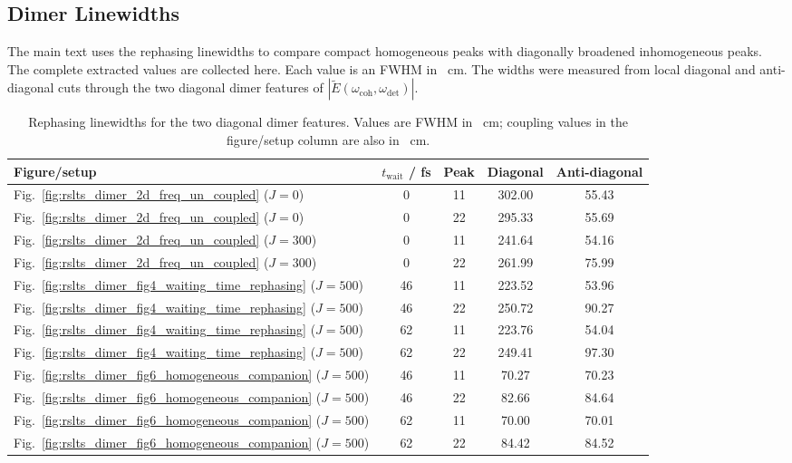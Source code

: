 \subsection{Dimer Linewidths}

The main text uses the rephasing linewidths to compare compact homogeneous
peaks with diagonally broadened inhomogeneous peaks. The complete extracted
values are collected here. Each value is an FWHM in \si{\per\centi\metre}. The
widths were measured from local diagonal and anti-diagonal cuts through the two
diagonal dimer features of
\(|\tilde{E}(\omega_{\mathrm{coh}},\omega_{\mathrm{det}})|\).

\begin{table}[htbp]
    \centering
    \scriptsize
    \caption{Rephasing linewidths for the two diagonal dimer features. Values
    are FWHM in \si{\per\centi\metre}; coupling values in the figure/setup
    column are also in \si{\per\centi\metre}.}
    \label{tab:app_dimer_2d_rephasing_linewidths}
    \begin{tabular}{@{}lcccc@{}}
        \toprule
        Figure/setup & $t_{\mathrm{wait}}$ / fs & Peak & Diagonal & Anti-diagonal \\
        \midrule
        Fig.~\ref{fig:rslts_dimer_2d_freq_un_coupled} ($J=0$)   & 0  & 11 & 302.00 & 55.43 \\
        Fig.~\ref{fig:rslts_dimer_2d_freq_un_coupled} ($J=0$)   & 0  & 22 & 295.33 & 55.69 \\
        Fig.~\ref{fig:rslts_dimer_2d_freq_un_coupled} ($J=300$) & 0  & 11 & 241.64 & 54.16 \\
        Fig.~\ref{fig:rslts_dimer_2d_freq_un_coupled} ($J=300$) & 0  & 22 & 261.99 & 75.99 \\
        Fig.~\ref{fig:rslts_dimer_fig4_waiting_time_rephasing} ($J=500$) & 46 & 11 & 223.52 & 53.96 \\
        Fig.~\ref{fig:rslts_dimer_fig4_waiting_time_rephasing} ($J=500$) & 46 & 22 & 250.72 & 90.27 \\
        Fig.~\ref{fig:rslts_dimer_fig4_waiting_time_rephasing} ($J=500$) & 62 & 11 & 223.76 & 54.04 \\
        Fig.~\ref{fig:rslts_dimer_fig4_waiting_time_rephasing} ($J=500$) & 62 & 22 & 249.41 & 97.30 \\
        Fig.~\ref{fig:rslts_dimer_fig6_homogeneous_companion} ($J=500$)  & 46 & 11 & 70.27  & 70.23 \\
        Fig.~\ref{fig:rslts_dimer_fig6_homogeneous_companion} ($J=500$)  & 46 & 22 & 82.66  & 84.64 \\
        Fig.~\ref{fig:rslts_dimer_fig6_homogeneous_companion} ($J=500$)  & 62 & 11 & 70.00  & 70.01 \\
        Fig.~\ref{fig:rslts_dimer_fig6_homogeneous_companion} ($J=500$)  & 62 & 22 & 84.42  & 84.52 \\
        \bottomrule
    \end{tabular}
\end{table}

